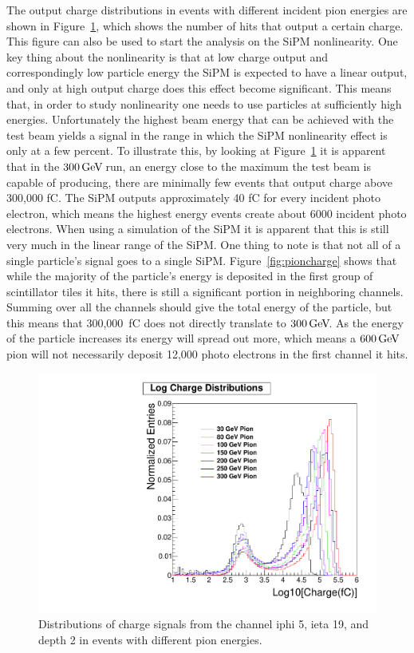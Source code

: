 The output charge distributions in events with different incident pion energies are shown in Figure~\ref{fig:Log}, which shows the number of hits that output a certain charge. This figure can also be used to start the analysis on the SiPM nonlinearity. One key thing about the nonlinearity is that at low charge output and correspondingly low particle energy the SiPM is expected to have a linear output, and only at high output charge does this effect become significant. This means that, in order to study nonlinearity one needs to use particles at sufficiently high energies. Unfortunately the highest beam energy that can be achieved with the test beam yields a signal in the range in which the SiPM nonlinearity effect is only at a few percent. To illustrate this, by looking at Figure~\ref{fig:Log} it is apparent that in the $300{\,\text{Ge\hspace{-.08em}V\hspace{-0.16em}}}$ run, an energy close to the maximum the test beam is capable of producing, there are minimally few events that output charge above 300,000 fC. The SiPM outputs approximately 40 fC for every incident photo electron, which means the highest energy events create about 6000 incident photo electrons. When using a simulation of the SiPM it is apparent that this is still very much in the linear range of the SiPM. One thing to note is that not all of a single particle's signal goes to a single SiPM. Figure~\ref{fig:pioncharge} shows that while the majority of the particle's energy is deposited in the first group of scintillator tiles it hits, there is still a significant portion in neighboring channels. Summing over all the channels should give the total energy of the particle, but this means that 300,000~fC does not directly translate to $300{\,\text{Ge\hspace{-.08em}V\hspace{-0.16em}}}$. As the energy of the particle increases its energy will spread out more, which means a $600{\,\text{Ge\hspace{-.08em}V\hspace{-0.16em}}}$ pion will not necessarily deposit 12,000 photo electrons in the first channel it hits.

\begin{figure}
\centering
\includegraphics[width=0.7\linewidth]{Figures/Logplot.pdf}
\caption{Distributions of charge signals from the channel iphi 5, ieta 19, and depth 2 in events with different pion energies.}
\label{fig:Log}
\end{figure}

